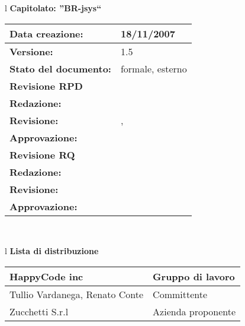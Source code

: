 

\newcommand{\lv}{ 1.5 } %
\newcommand{\dt}{ Specifica Tecnica }%


\begin{center}
\thispagestyle{plain}
\begin{table}[htbp]
\large{
\begin{tabular}{l}
\Large{\textbf{\textsf{Capitolato: ''BR-jsys``}}} \\
\begin{tabular}{|p{6cm}|p{6cm}|} \hline
\textbf{Data creazione:} & 18/11/2007 \\ \hline
\textbf{Versione:} & \lv \\ \hline
\textbf{Stato del documento:} & formale, esterno \\ \hline
\textbf{Revisione RPD} &   \\ \hline
\textbf{Redazione:} & \MB \\ \hline
\textbf{Revisione:} & \AT , \ET  \\ \hline
\textbf{Approvazione:}  & \MM \\ \hline
\textbf{Revisione RQ} &   \\ \hline
\textbf{Redazione:} & \ET \\ \hline
\textbf{Revisione:} & \FC \\ \hline
\textbf{Approvazione:}  & \AT \\ \hline
\end{tabular} \\
\end{tabular}
}
\end{table}
\end{center}

\begin{center}
\begin{table}[hbtp]
\large{
\begin{tabular}{l}
\Large{\textbf{\textsf{Lista di distribuzione}}} \\
\begin{tabular}{|p{6cm}|p{6cm}|} \hline
{HappyCode inc}& Gruppo di lavoro\\ \hline
{Tullio Vardanega, Renato Conte}& Committente \\ \hline 
{Zucchetti S.r.l}& Azienda proponente\\ \hline
\end{tabular} \\
\end{tabular}
}
\end{table}
\end{center}

